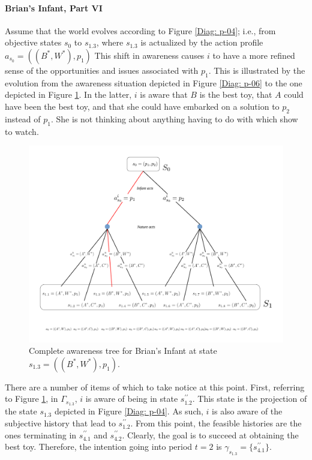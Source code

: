 \documentclass[
11pt,
titlepage,
reqno,
]{article}%
\theoremstyle{definition}
\begin{document}
\paragraph{Brian's Infant, Part VI}
Assume that the world evolves according to Figure \ref{Diag: p-04}; i.e., from objective states $s_0$ to $s_{1.3}$, where $s_{1.3}$ is actualized by the action profile $a_{s_0}=((B^\ast,W^\ast),p_1)$
This shift in awareness causes $i$ to have a more refined sense of the opportunities and issues associated with $p_1$.
This is illustrated by the evolution from the awareness situation depicted in Figure \ref{Diag: p-06} to the one depicted in Figure \ref{Diag: p-07}. 
In the latter, $i$ is aware that $B$ is the best toy, that $A$ could have been the best toy, and that she could have embarked on a solution to $p_2$ instead of $p_1$. 
She is not thinking about anything having to do with which show to watch.

\begin{figure}[h!]
	\centering
	\includegraphics*[page=7,trim = 3in 0in 0in 0in,scale=.7]{Awareness_Diagrams_All}
	\caption{Complete awareness tree for Brian's Infant at state $s_{1.3}=((B^\ast,W^\ast),p_1)$.\label{Diag: p-07}}%
\end{figure}

There are a number of items of which to take notice at this point.
First, referring to Figure \ref{Diag: p-07}, in $\Gamma_{s_{1.3}} $, $i$ is aware of being in state $s^{\prime\prime}_{1.2}$.
This state is the projection of the state  $s_{1.3}$ depicted in Figure \ref{Diag: p-04}.
As such, $i$ is also aware of the subjective history that lead to $s^{\prime\prime}_{1.2}$.
From this point, the feasible histories are the ones terminating in $s^{\prime\prime}_{4.1}$ and $s^{\prime\prime}_{4.2}$.
Clearly, the goal is to succeed at obtaining the best toy.
Therefore, the intention going into period $t=2$ is $\gamma_{s_{1.3}}=\{s^{\prime\prime}_{4.1}\}$.
\end{document}
